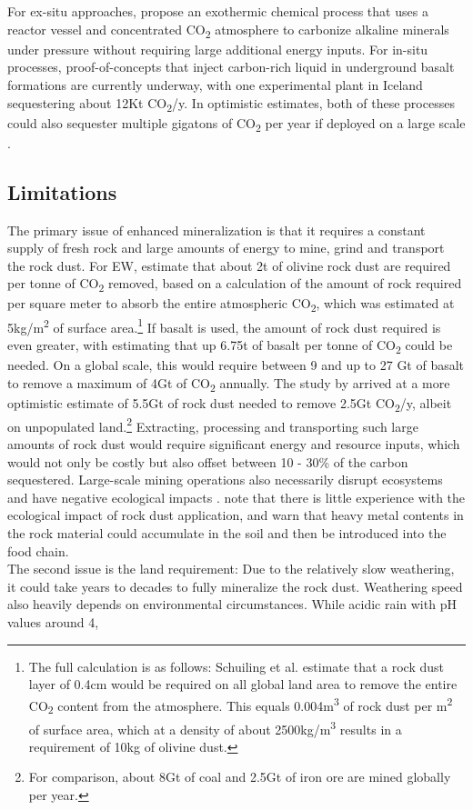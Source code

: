 For ex-situ approaches, \textcite{Lackner1997ProgressSubstrates} propose an exothermic chemical process that uses a reactor vessel and concentrated CO\textsubscript{2} atmosphere to carbonize alkaline minerals under pressure without requiring large additional energy inputs. For in-situ processes, proof-of-concepts that inject carbon-rich liquid in underground basalt formations are currently underway, with one experimental plant in Iceland sequestering about 12Kt CO\textsubscript{2}/y. In optimistic estimates, both of these processes could also sequester multiple gigatons of CO\textsubscript{2} per year if deployed on a large scale \parencite{Dipple2021TheSystems}.
\subsection*{Limitations}
The primary issue of enhanced mineralization is that it requires a constant supply of fresh rock and large amounts of energy to mine, grind and transport the rock dust. For EW, \textcite{Schuiling2006EnhancedCo2} estimate that about 2t of olivine rock dust are required per tonne of CO\textsubscript{2} removed, based on a calculation of the amount of rock required per square meter to absorb the entire atmospheric CO\textsubscript{2}, which was estimated at 5kg/m\textsuperscript{2} of surface area.\footnote{The full calculation is as follows: Schuiling et al. estimate that a rock dust layer of 0.4cm would be required on all global land area to remove the entire CO\textsubscript{2} content from the atmosphere. This equals 0.004m\textsuperscript{3} of rock dust per m\textsuperscript{2} of surface area, which at a density of about 2500kg/m\textsuperscript{3} results in a requirement of 10kg of olivine dust.} If basalt is used, the amount of rock dust required is even greater, with \textcite{Beerling2018FarmingSecurity} estimating that up 6.75t of basalt per tonne of CO\textsubscript{2} could be needed. On a global scale, this would require between 9 and up to 27 Gt of basalt to remove a maximum of 4Gt of CO\textsubscript{2} annually. The study by \textcite{Goll2021PotentialRock} arrived at a more optimistic estimate of 5.5Gt of rock dust needed to remove 2.5Gt CO\textsubscript{2}/y, albeit on unpopulated land.\footnote{For comparison, about 8Gt of coal and 2.5Gt of iron ore are mined globally per year.} Extracting, processing and transporting such large amounts of rock dust would require significant energy and resource inputs, which would not only be costly but also offset between 10 - 30\% of the carbon sequestered. Large-scale mining operations also necessarily disrupt ecosystems and have negative ecological impacts \parencite{Beerling2018FarmingSecurity}. \textcite{Almaraz2022MethodsSettings} note that there is little experience with the ecological impact of rock dust application, and warn that heavy metal contents in the rock material could accumulate in the soil and then be introduced into the food chain.\\The second issue is the land requirement: Due to the relatively slow weathering, it could take years to decades to fully mineralize the rock dust. Weathering speed also heavily depends on environmental circumstances. While acidic rain with pH values around 4, 